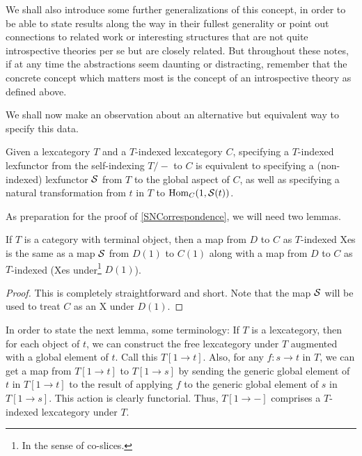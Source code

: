 We shall also introduce some further generalizations of this concept, in order to be able to state results along the way in their fullest generality or point out connections to related work or interesting structures that are not quite introspective theories per se but are closely related. But throughout these notes, if at any time the abstractions seem daunting or distracting, remember that the concrete concept which matters most is the concept of an introspective theory as defined above.

We shall now make an observation about an alternative but equivalent way to specify this data.

\begin{theorem}\label{SNCorrespondence}
Given a lexcategory $T$ and a $T$-indexed lexcategory $C$, specifying a $T$-indexed lexfunctor from the self-indexing $T/-$ to $C$ is equivalent to specifying a (non-indexed) lexfunctor $\mathcal{S}$ from $T$ to the global aspect of $C$, as well as specifying a natural transformation from $t$ in $T$ to $\operatorname{Hom}_C(1, \mathcal{S}(t))$.
\end{theorem}

As preparation for the proof of \cref{SNCorrespondence}, we will need two lemmas.

\begin{lemma}\label{Lemma1}
If $T$ is a category with terminal object, then a map from $D$ to $C$ as $T$-indexed Xes is the same as a map $\mathcal{S}$ from $D(1)$ to $C(1)$ along with a map from $D$ to $C$ as $T$-indexed (Xes under\footnote{In the sense of co-slices.} $D(1)$).
\end{lemma}
\begin{proof}
This is completely straightforward and short. Note that the map $\mathcal{S}$ will be used to treat $C$ as an X under $D(1)$. \TODO
\end{proof}

In order to state the next lemma, some terminology: If $T$ is a lexcategory, then for each object of $t$, we can construct the free lexcategory under $T$ augmented with a global element of $t$. Call this $T[1 \to t]$. Also, for any $f : s \to t$ in $T$, we can get a map from $T[1 \to t]$ to $T[1 \to s]$ by sending the generic global element of $t$ in $T[1 \to t]$ to the result of applying $f$ to the generic global element of $s$ in $T[1 \to s]$. This action is clearly functorial. Thus, $T[1 \to -]$ comprises a $T$-indexed lexcategory under $T$. 

